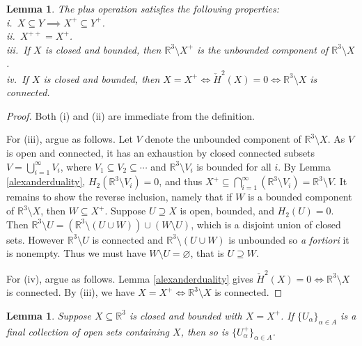 \documentclass[12pt]{article}
\theoremstyle{plain}
\newtheorem{lemma}[theorem]{Lemma}
\theoremstyle{definition}
\theoremstyle{remark}
\numberwithin{equation}{section}
\begin{document}
\begin{lemma}\label{plusprop}
The plus operation satisfies the following properties:\\
\indent i.\ $X\subseteq Y\implies X^+\subseteq Y^+$.\\
\indent ii.\ $X^{++}=X^+$.\\
\indent iii.\ If $X$ is closed and bounded, then $\mathbb R^3\setminus X^+$ is the unbounded component of $\mathbb R^3\setminus X$.\\
\indent iv.\ If $X$ is closed and bounded, then $X=X^+\iff\check H^2(X)=0\iff\mathbb R^3\setminus X$ is connected.
\end{lemma}

\begin{proof}
Both (i) and (ii) are immediate from the definition.

For (iii), argue as follows.  Let $V$ denote the unbounded component of $\mathbb R^3\setminus X$.  As $V$ is open and connected, it has an exhaustion by closed connected subsets $V=\bigcup_{i=1}^\infty V_i$, where $V_1\subseteq V_2\subseteq\cdots$ and $\mathbb R^3\setminus V_i$ is bounded for all $i$.  By Lemma \ref{alexanderduality}, $H_2(\mathbb R^3\setminus V_i)=0$, and thus $X^+\subseteq\bigcap_{i=1}^\infty(\mathbb R^3\setminus V_i)=\mathbb R^3\setminus V$.  It remains to show the reverse inclusion, namely that if $W$ is a bounded component of $\mathbb R^3\setminus X$, then $W\subseteq X^+$.  Suppose $U\supseteq X$ is open, bounded, and $H_2(U)=0$.  Then $\mathbb R^3\setminus U=(\mathbb R^3\setminus(U\cup W))\cup(W\setminus U)$, which is a disjoint union of closed sets.  However $\mathbb R^3\setminus U$ is connected and $\mathbb R^3\setminus(U\cup W)$ is unbounded so \emph{a fortiori} it is nonempty.  Thus we must have $W\setminus U=\varnothing$, that is $U\supseteq W$.

For (iv), argue as follows.  Lemma \ref{alexanderduality} gives $\check H^2(X)=0\iff\mathbb R^3\setminus X$ is connected.  By (iii), we have $X=X^+\iff\mathbb R^3\setminus X$ is connected.
\end{proof}

\begin{lemma}\label{plusfinal}
Suppose $X\subseteq\mathbb R^3$ is closed and bounded with $X=X^+$.  If $\{U_\alpha\}_{\alpha\in A}$ is a final collection of open sets containing $X$, then so is $\{U_\alpha^+\}_{\alpha\in A}$.
\end{lemma}
\end{document}
